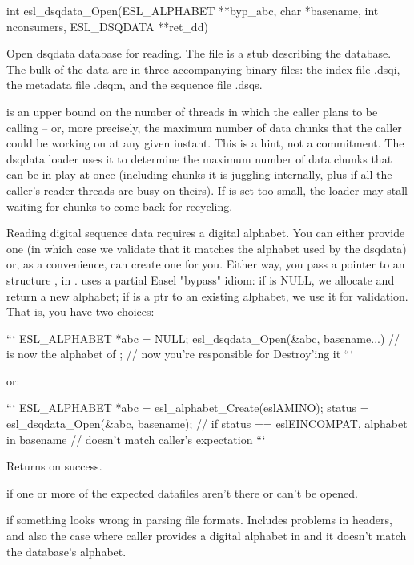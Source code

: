 \begin{sreapi}
\hypertarget{func:esl_dsqdata_Open()}
{\item[int esl\_dsqdata\_Open(ESL\_ALPHABET **byp\_abc, char *basename, int nconsumers, ESL\_DSQDATA **ret\_dd)]}

Open dsqdata database  for reading.  The file
 is a stub describing the database. The bulk
of the data are in three accompanying binary files: the
index file .dsqi, the metadata file
.dsqm, and the sequence file .dsqs.

 is an upper bound on the number of threads
in which the caller plans to be calling
 -- or, more precisely, the maximum
number of data chunks that the caller could be working
on at any given instant.  This is a hint, not a
commitment. The dsqdata loader uses it to determine the
maximum number of data chunks that can be in play at
once (including chunks it is juggling internally, plus
if all the caller's reader threads are busy on
theirs). If  is set too small, the loader
may stall waiting for chunks to come back for recycling.

Reading digital sequence data requires a digital
alphabet.  You can either provide one (in which case we
validate that it matches the alphabet used by the
dsqdata) or, as a convenience,  can
create one for you. Either way, you pass a pointer to an
 structure , in .  
uses a partial Easel "bypass" idiom: if  is
NULL, we allocate and return a new alphabet; if
 is a ptr to an existing alphabet, we use it
for validation. That is, you have two choices:

```
ESL_ALPHABET *abc = NULL;
esl_dsqdata_Open(&abc, basename...)
//  is now the alphabet of ; 
// now you're responsible for Destroy'ing it
```

or:

```
ESL_ALPHABET *abc = esl_alphabet_Create(eslAMINO);
status = esl_dsqdata_Open(&abc, basename);
// if status == eslEINCOMPAT, alphabet in basename 
// doesn't match caller's expectation
```

Returns  on success.

 if one or more of the expected datafiles
aren't there or can't be opened.

 if something looks wrong in parsing file
formats.  Includes problems in headers, and also the
case where caller provides a digital alphabet in
 and it doesn't match the database's alphabet.


\end{sreapi}
